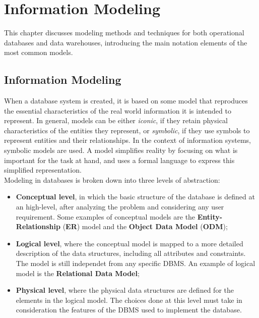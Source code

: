 \chapter{Information Modeling}

This chapter discusses modeling methods and techniques for both operational databases and data warehouses, introducing the main notation elements of the most common models.

\section{Information Modeling}

When a database system is created, it is based on some model that reproduces the essential characteristics of the real world information it is intended to represent. In general, models can be either \textit{iconic}, if they retain physical characteristics of the entities they represent, or \textit{symbolic}, if they use symbols to represent entities and their relationships. In the context of information systems, symbolic models are used.
A model simplifies reality by focusing on what is important for the task at hand, and uses a formal language to express this simplified representation.\\
Modeling in databases is broken down into three levels of abstraction:
\begin{itemize}
    \item \textbf{Conceptual level}, in which the basic structure of the database is defined at an high-level, after analyzing the problem and considering any user requirement. Some examples of conceptual models are the \textbf{Entity-Relationship} (\textbf{ER}) model and the \textbf{Object Data Model} (\textbf{ODM});
    \item \textbf{Logical level}, where the conceptual model is mapped to a more detailed description of the data structures, including all attributes and constraints. The model is still independet from any specific DBMS. An example of logical model is the \textbf{Relational Data Model};
    \item \textbf{Physical level}, where the physical data structures are defined for the elements in the logical model. The choices done at this level must take in consideration the features of the DBMS used to implement the database.
\end{itemize}

